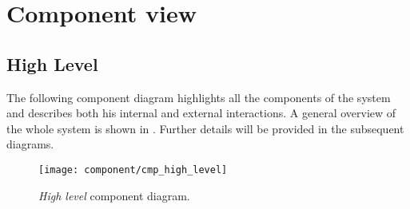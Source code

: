 \section{Component view}

\subsection{High Level}
The following component diagram highlights all the components of the system and describes both his internal and external interactions.
A general overview of the whole system is shown in . Further details will be provided in the subsequent diagrams.

\begin{figure}[H]
	\centering
	\texttt{[image: component/cmp\_high\_level]}
	\caption{\textit{High level} component diagram.}
	\label{fig:cmp_high_level}
\end{figure}

